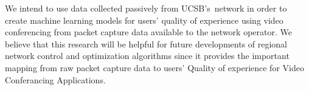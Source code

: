     \hfill \break
    

    We intend to use data collected passively from UCSB's~network in order to create machine learning models for users' quality of experience using video conferencing from packet capture data available to the network operator. We believe that this research will be helpful for future developments of regional network control and optimization algorithms since it provides the important mapping from raw packet capture data to users' Quality of experience for Video Conferancing Applications. 

